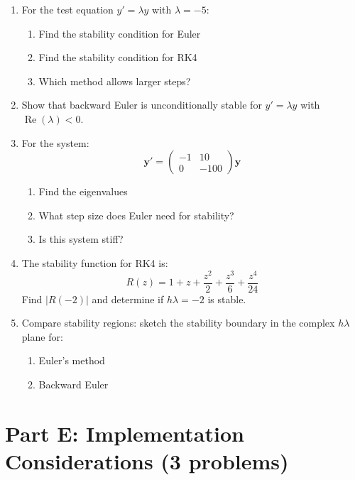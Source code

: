 \documentclass[12pt]{article}
\begin{document}
\begin{enumerate}[resume]
\item For the test equation $y' = \lambda y$ with $\lambda = -5$:
\begin{enumerate}[label=(\alph*)]
\item Find the stability condition for Euler
\item Find the stability condition for RK4
\item Which method allows larger steps?
\end{enumerate}

\item Show that backward Euler is unconditionally stable for $y' = \lambda y$ with $\operatorname{Re}(\lambda) < 0$.

\item For the system:
$$\mathbf{y}' = \begin{pmatrix} -1 & 10 \\ 0 & -100 \end{pmatrix} \mathbf{y}$$
\begin{enumerate}[label=(\alph*)]
\item Find the eigenvalues
\item What step size does Euler need for stability?
\item Is this system stiff?
\end{enumerate}

\item The stability function for RK4 is:
$$R(z) = 1 + z + \frac{z^{2}}{2} + \frac{z^{3}}{6} + \frac{z^{4}}{24}$$
Find $|R(-2)|$ and determine if $h\lambda = -2$ is stable.

\item Compare stability regions: sketch the stability boundary in the complex $h\lambda$ plane for:
\begin{enumerate}[label=(\alph*)]
\item Euler's method
\item Backward Euler
\end{enumerate}
\end{enumerate}

\section*{Part E: Implementation Considerations (3 problems)}
\end{document}

